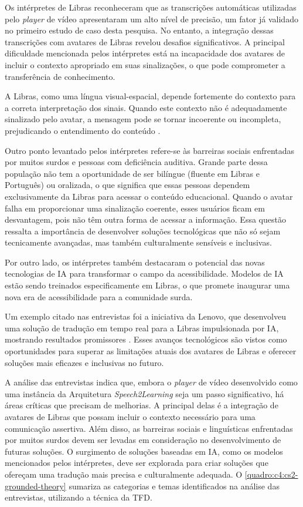 Os intérpretes de Libras reconheceram que as transcrições automáticas utilizadas pelo \textit{player} de vídeo apresentaram um alto nível de precisão, um fator já validado no primeiro estudo de caso desta pesquisa. No entanto, a integração dessas transcrições com avatares de Libras revelou desafios significativos. A principal dificuldade mencionada pelos intérpretes está na incapacidade dos avatares de incluir o contexto apropriado em suas sinalizações, o que pode comprometer a transferência de conhecimento. 

A Libras, como uma língua visual-espacial, depende fortemente do contexto para a correta interpretação dos sinais. Quando este contexto não é adequadamente sinalizado pelo avatar, a mensagem pode se tornar incoerente ou incompleta, prejudicando o entendimento do conteúdo \cite{Quadros2017, Quadros2019, Honora2021}.

Outro ponto levantado pelos intérpretes refere-se às barreiras sociais enfrentadas por muitos surdos e pessoas com deficiência auditiva. Grande parte dessa população não tem a oportunidade de ser bilíngue (fluente em Libras e Português) ou oralizada, o que significa que essas pessoas dependem exclusivamente da Libras para acessar o conteúdo educacional. Quando o avatar falha em proporcionar uma sinalização coerente, esses usuários ficam em desvantagem, pois não têm outra forma de acessar a informação. Essa questão ressalta a importância de desenvolver soluções tecnológicas que não só sejam tecnicamente avançadas, mas também culturalmente sensíveis e inclusivas.

Por outro lado, os intérpretes também destacaram o potencial das novas tecnologias de IA para transformar o campo da acessibilidade. Modelos de IA estão sendo treinados especificamente em Libras, o que promete inaugurar uma nova era de acessibilidade para a comunidade surda. 

Um exemplo citado nas entrevistas foi a iniciativa da Lenovo, que desenvolveu uma solução de tradução em tempo real para a Libras impulsionada por IA, mostrando resultados promissores \cite{Lenovo2023}. Esses avanços tecnológicos são vistos como oportunidades para superar as limitações atuais dos avatares de Libras e oferecer soluções mais eficazes e inclusivas no futuro.

A análise das entrevistas indica que, embora o \textit{player} de vídeo desenvolvido como uma instância da Arquitetura \textit{Speech2Learning} seja um passo significativo, há áreas críticas que precisam de melhorias. A principal delas é a integração de avatares de Libras que possam incluir o contexto necessário para uma comunicação assertiva. Além disso, as barreiras sociais e linguísticas enfrentadas por muitos surdos devem ser levadas em consideração no desenvolvimento de futuras soluções. O surgimento de soluções baseadas em IA, como os modelos mencionados pelos intérpretes, deve ser explorada para criar soluções que ofereçam uma tradução mais precisa e culturalmente adequada. O \autoref{quadro:c4:cs2-grounded-theory} sumariza as categorias e temas identificados na análise das entrevistas, utilizando a técnica da TFD.

